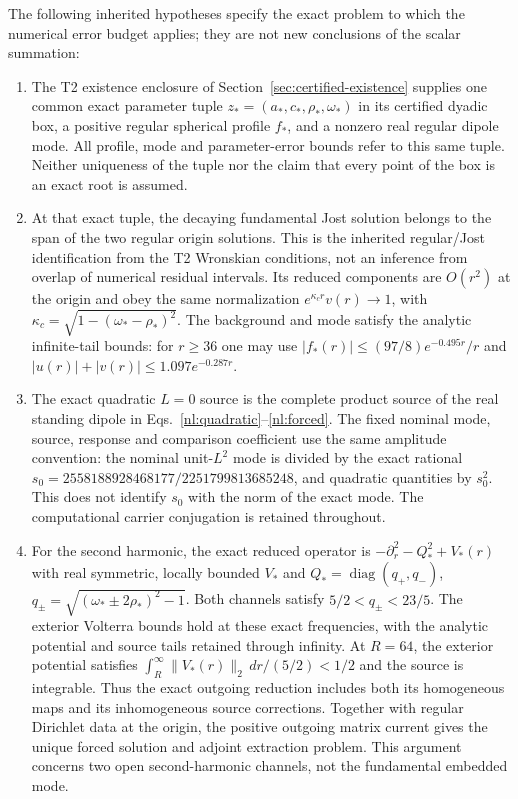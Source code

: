 The following inherited hypotheses specify the exact problem to which
the numerical error budget applies; they are not new conclusions of
the scalar summation:
\begin{enumerate}
\item The T2 existence enclosure of Section~\ref{sec:certified-existence}
supplies one common exact parameter tuple
$z_*=(a_*,c_*,\rho_*,\omega_*)$ in its certified dyadic box, a positive
regular spherical profile $f_*$, and a nonzero real regular dipole mode.
All profile, mode and parameter-error bounds refer to this same tuple.
Neither uniqueness of the tuple nor the claim that every point of the
box is an exact root is assumed.

\item At that exact tuple, the decaying fundamental Jost solution belongs
to the span of the two regular origin solutions. This is the inherited
regular/Jost identification from the T2 Wronskian conditions, not an
inference from overlap of numerical residual intervals. Its reduced
components are $O(r^2)$ at the origin and obey the same normalization
$e^{\kappa_c r}v(r)\to1$, with
$\kappa_c=\sqrt{1-(\omega_*-\rho_*)^2}$.
The background and mode satisfy the analytic infinite-tail bounds:
for $r\ge36$ one may use
$|f_*(r)|\le(97/8)e^{-0.495r}/r$ and
$|u(r)|+|v(r)|\le1.097e^{-0.287r}$.

\item The exact quadratic $L=0$ source is the complete product source
of the real standing dipole in Eqs.~\eqref{nl:quadratic}--\eqref{nl:forced}.
The fixed nominal mode, source, response and comparison coefficient
use the same amplitude convention: the nominal unit-$L^2$ mode is divided
by the exact rational
$s_0=2558188928468177/2251799813685248$, and quadratic quantities by $s_0^2$.
This does not identify $s_0$ with the norm of the exact mode.
The computational carrier conjugation is retained throughout.

\item For the second harmonic, the exact reduced operator is
$-\partial_r^2-Q_*^2+V_*(r)$ with real symmetric, locally bounded
$V_*$ and
$Q_*=\operatorname{diag}(q_+,q_-)$,
$q_\pm=\sqrt{(\omega_*\pm2\rho_*)^2-1}$.
Both channels satisfy $5/2<q_\pm<23/5$.
The exterior Volterra bounds hold at these exact frequencies,
with the analytic potential and source tails retained through infinity.
At $R=64$, the exterior potential satisfies
$\int_R^\infty\|V_*(r)\|_2\,dr/(5/2)<1/2$ and the source is integrable.
Thus the exact outgoing reduction includes both its homogeneous maps
and its inhomogeneous source corrections. Together with regular
Dirichlet data at the origin, the positive outgoing matrix current
gives the unique forced solution and adjoint extraction problem.
This argument concerns two open second-harmonic channels, not the
fundamental embedded mode.


\end{enumerate}
